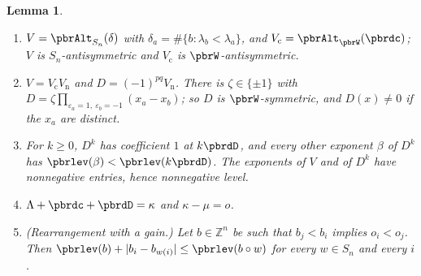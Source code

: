 \documentclass[10pt]{amsart}
\newtheorem{lemma}[theorem]{Lemma}
\theoremstyle{definition}
\theoremstyle{remark}
\newcommand{\Z}{\mathbb Z}
\begin{document}
\begin{lemma}\label{pbr:basic}
\begin{enumerate}
\item[(a)] $V=\pbrAlt_{S_n}(\delta)$ with $\delta_a=\#\{b:\lambda_b<\lambda_a\}$, and $V_{\mathrm c}=
\pbrAlt_{\pbrW}(\pbrdc)$; $V$ is $S_n$-antisymmetric and $V_{\mathrm c}$ is $\pbrW$-antisymmetric.
\item[(b)] $V=V_{\mathrm c}V_{\mathrm n}$ and $D=(-1)^{pq}V_{\mathrm n}$. There is $\zeta\in\{\pm1\}$
with $D=\zeta\prod_{\varepsilon_a=1,\ \varepsilon_b=-1}(x_a-x_b)$; so $D$ is $\pbrW$-symmetric, and
$D(x)\ne0$ if the $x_a$ are distinct.
\item[(c)] For $k\ge0$, $D^k$ has coefficient $1$ at $k\pbrdD$, and every other exponent $\beta$ of
$D^k$ has $\pbrlev(\beta)<\pbrlev(k\pbrdD)$. The exponents of $V$ and of $D^k$ have nonnegative
entries, hence nonnegative level.
\item[(d)] $\Lambda+\pbrdc+\pbrdD=\kappa$ and $\kappa-\mu=o$.
\item[(e)] \textup{(Rearrangement with a gain.)} Let $b\in\Z^n$ be such that $b_j<b_i$ implies
$o_i<o_j$. Then $\pbrlev(b)+|b_i-b_{w(i)}|\le\pbrlev(b\circ w)$ for every $w\in S_n$ and every $i$.
\end{enumerate}
\end{lemma}
\end{document}
